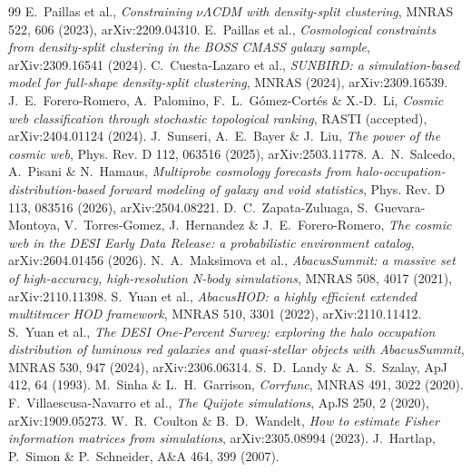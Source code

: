\begin{thebibliography}{99}
 E.~Paillas et al., \emph{Constraining $\nu\Lambda$CDM with density-split clustering}, MNRAS 522, 606 (2023), arXiv:2209.04310.
 E.~Paillas et al., \emph{Cosmological constraints from density-split clustering in the BOSS CMASS galaxy sample}, arXiv:2309.16541 (2024).
 C.~Cuesta-Lazaro et al., \emph{SUNBIRD: a simulation-based model for full-shape density-split clustering}, MNRAS (2024), arXiv:2309.16539.
 J.~E.~Forero-Romero, A.~Palomino, F.~L.~G\'omez-Cort\'es \& X.-D.~Li, \emph{Cosmic web classification through stochastic topological ranking}, RASTI (accepted), arXiv:2404.01124 (2024).
 J.~Sunseri, A.~E.~Bayer \& J.~Liu, \emph{The power of the cosmic web}, Phys. Rev. D 112, 063516 (2025), arXiv:2503.11778.
 A.~N.~Salcedo, A.~Pisani \& N.~Hamaus, \emph{Multiprobe cosmology forecasts from halo-occupation-distribution-based forward modeling of galaxy and void statistics}, Phys. Rev. D 113, 083516 (2026), arXiv:2504.08221.
 D.~C.~Zapata-Zuluaga, S.~Guevara-Montoya, V.~Torres-Gomez, J.~Hernandez \& J.~E.~Forero-Romero, \emph{The cosmic web in the DESI Early Data Release: a probabilistic environment catalog}, arXiv:2604.01456 (2026).
 N.~A.~Maksimova et al., \emph{AbacusSummit: a massive set of high-accuracy, high-resolution N-body simulations}, MNRAS 508, 4017 (2021), arXiv:2110.11398.
 S.~Yuan et al., \emph{AbacusHOD: a highly efficient extended multitracer HOD framework}, MNRAS 510, 3301 (2022), arXiv:2110.11412.
 S.~Yuan et al., \emph{The DESI One-Percent Survey: exploring the halo occupation distribution of luminous red galaxies and quasi-stellar objects with AbacusSummit}, MNRAS 530, 947 (2024), arXiv:2306.06314.
 S.~D.~Landy \& A.~S.~Szalay, ApJ 412, 64 (1993).
 M.~Sinha \& L.~H.~Garrison, \emph{Corrfunc}, MNRAS 491, 3022 (2020).
 F.~Villaescusa-Navarro et al., \emph{The Quijote simulations}, ApJS 250, 2 (2020), arXiv:1909.05273.
 W.~R.~Coulton \& B.~D.~Wandelt, \emph{How to estimate Fisher information matrices from simulations}, arXiv:2305.08994 (2023).
 J.~Hartlap, P.~Simon \& P.~Schneider, A\&A 464, 399 (2007).
\end{thebibliography}
